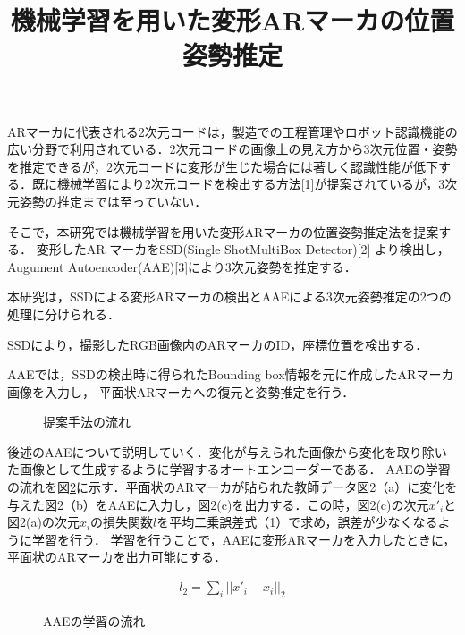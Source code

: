 \documentclass{jsarticle}
\title{機械学習を用いた変形ARマーカの位置姿勢推定}
\begin{document}
\maketitle

ARマーカに代表される2次元コードは，製造での工程管理やロボット認識機能の広い分野で利用されている．2次元コードの画像上の見え方から3次元位置・姿勢を推定できるが，2次元コードに変形が生じた場合には著しく認識性能が低下する．既に機械学習により2次元コードを検出する方法[1]が提案されているが，3次元姿勢の推定までは至っていない．

そこで，本研究では機械学習を用いた変形ARマーカの位置姿勢推定法を提案する．
変形したAR マーカをSSD(Single ShotMultiBox Detector)[2]
より検出し，Augument Autoencoder(AAE)[3]により3次元姿勢を推定する．


本研究は，SSDによる変形ARマーカの検出とAAEによる3次元姿勢推定の2つの処理に分けられる．

SSDにより，撮影したRGB画像内のARマーカのID，座標位置を検出する．

AAEでは，SSDの検出時に得られたBounding box情報を元に作成したARマーカ画像を入力し，
平面状ARマーカへの復元と姿勢推定を行う．

\begin{figure}[ht]
\vspace{0zh}
\setlength{\epsfxsize}{6.5cm}
\centerline{}
\vspace{-1zh}
\caption{提案手法の流れ}
\label{flow}
\vspace{-2zh}
\end{figure}

後述のAAEについて説明していく．変化が与えられた画像から変化を取り除いた画像として生成するように学習するオートエンコーダーである．
AAEの学習の流れを図\ref{BB}に示す．平面状のARマーカが貼られた教師データ図2（a）に変化を与えた図2（b）をAAEに入力し，図2(c)を出力する．この時，図2(c)の次元$x'_i$と図2(a)の次元$x_i$の損失関数$l$を平均二乗誤差式（1）で求め，誤差が少なくなるように学習を行う．
学習を行うことで，AAEに変形ARマーカを入力したときに，平面状のARマーカを出力可能にする．

\begin{eqnarray}
\label{sonsitu}
l_2=\sum_{i} ||x'_i-x_i||_2
\end{eqnarray}

\begin{figure}[ht]
\vspace{0zh}
\setlength{\epsfxsize}{7.5cm}
\centerline{}
\vspace{0zh}
\caption{AAEの学習の流れ}
\label{BB}
\vspace{1zh}
\end{figure}
\end{document}
